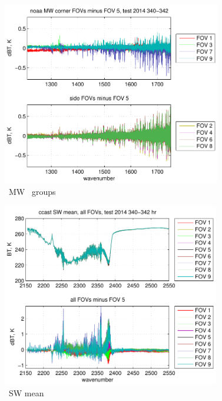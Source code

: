 \documentclass[12pt]{article}
\begin{document}

\begin{figure}
  \centering
  \includegraphics[height=8cm]{figures/noaa_MW_dif_2014_340-342.pdf}
  \caption{\noaa\ MW \fov\ groups}
\end{figure}



\begin{figure}
  \centering
  \includegraphics[height=8cm]{figures/ccast_SW_avg_2014_340-342_hr.pdf}
  \caption{\ccast\ SW mean}
\end{figure}

\end{document}
